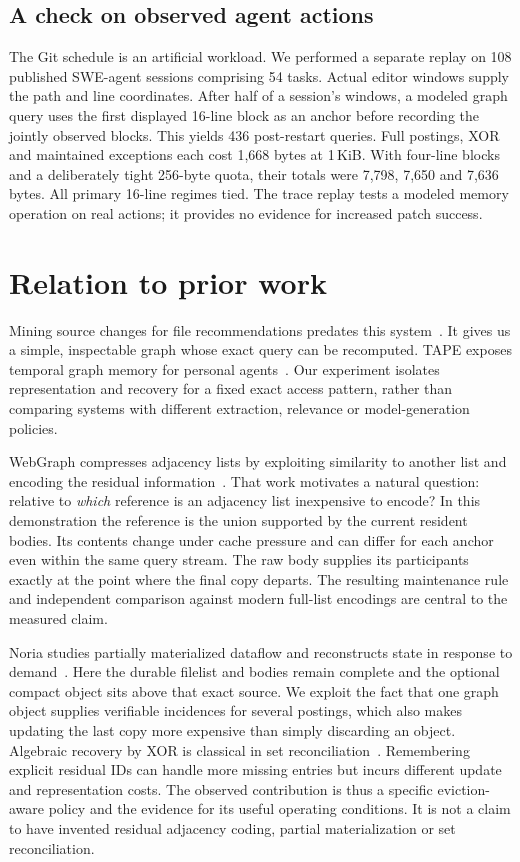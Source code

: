 \documentclass[conference]{IEEEtran}
\begin{document}
\subsection{A check on observed agent actions}
The Git schedule is an artificial workload. We performed a separate replay on 108 published SWE-agent sessions comprising 54 tasks. Actual editor windows supply the path and line coordinates. After half of a session's windows, a modeled graph query uses the first displayed 16-line block as an anchor before recording the jointly observed blocks. This yields 436 post-restart queries. Full postings, XOR and maintained exceptions each cost 1,668 bytes at 1\,KiB. With four-line blocks and a deliberately tight 256-byte quota, their totals were 7,798, 7,650 and 7,636 bytes. All primary 16-line regimes tied. The trace replay tests a modeled memory operation on real actions; it provides no evidence for increased patch success.
\section{Relation to prior work}
Mining source changes for file recommendations predates this system~\cite{rose,moonen}. It gives us a simple, inspectable graph whose exact query can be recomputed.  TAPE exposes temporal graph memory for personal agents~\cite{tape}. Our experiment isolates representation and recovery for a fixed exact access pattern, rather than comparing systems with different extraction, relevance or model-generation policies.

WebGraph compresses adjacency lists by exploiting similarity to another list and encoding the residual information~\cite{webgraph}. That work motivates a natural question: relative to \emph{which} reference is an adjacency list inexpensive to encode? In this demonstration the reference is the union supported by the current resident bodies. Its contents change under cache pressure and can differ for each anchor even within the same query stream. The raw body supplies its participants exactly at the point where the final copy departs. The resulting maintenance rule and independent comparison against modern full-list encodings are central to the measured claim.

Noria studies partially materialized dataflow and reconstructs state in response to demand~\cite{noria}. Here the durable filelist and bodies remain complete and the optional compact object sits above that exact source. We exploit the fact that one graph object supplies verifiable incidences for several postings, which also makes updating the last copy more expensive than simply discarding an object. Algebraic recovery by XOR is classical in set reconciliation~\cite{iblt}. Remembering explicit residual IDs can handle more missing entries but incurs different update and representation costs. The observed contribution is thus a specific eviction-aware policy and the evidence for its useful operating conditions. It is not a claim to have invented residual adjacency coding, partial materialization or set reconciliation.
\end{document}
